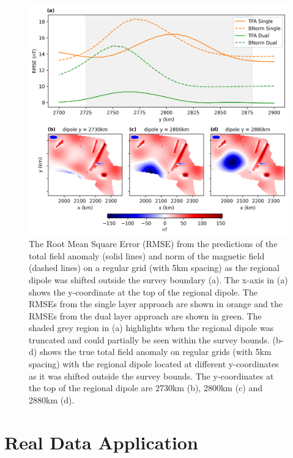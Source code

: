 \begin{figure}[!h]
\centering
\includegraphics[width=1\linewidth]{paper/figures/truncated_regional_rmses.png}
\caption{
    The Root Mean Square Error (RMSE) from the predictions of the total field anomaly (solid lines) and norm of the magnetic field (dashed lines) on a regular grid (with 5km spacing) as the regional dipole was shifted outside the survey boundary (a). The x-axis in (a) shows the y-coordinate at the top of the regional dipole. The RMSEs from the single layer approach are shown in orange and the RMSEs from the dual layer approach are shown in green. The shaded grey region in (a) highlights when the regional dipole was truncated and could partially be seen within the survey bounds. (b-d) shows the true total field anomaly on regular grids (with 5km spacing) with the regional dipole located at different y-coordinates as it was shifted outside the survey bounds. The y-coordinates at the top of the regional dipole are 2730km (b), 2800km (c) and 2880km (d).
}
\label{fig:truncated_regional_rmses}
\end{figure}


\section{Real Data Application}
\label{sec:real_application}

